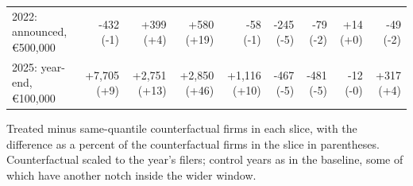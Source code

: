 \begin{table}[!tbp]
{\begin{tabular}{lrrrrrrrr}
2022: announced, \euro{}500,000 & -432 (-1) & +399 (+4) & +580 (+19) & -58 (-1) & -245 (-5) & -79 (-2) & +14 (+0) & -49 (-2) \\
2025: year-end, \euro{}100,000 & +7,705 (+9) & +2,751 (+13) & +2,850 (+46) & +1,116 (+10) & -467 (-5) & -481 (-5) & -12 (-0) & +317 (+4) \\
\bottomrule\end{tabular}}
\begin{minipage}{0.95\linewidth}\vspace{2pt}\footnotesize Treated minus same-quantile counterfactual firms in each slice, with the difference as a percent of the counterfactual firms in the slice in parentheses. Counterfactual scaled to the year's filers; control years as in the baseline, some of which have another notch inside the wider window.\end{minipage}
\end{table}